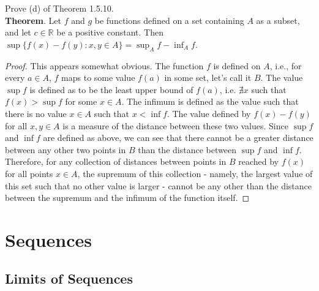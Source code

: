 \documentclass[12pt]{book}
\newenvironment{exercise}[2][Exercise]{\begin{trivlist}
\item[\hskip \labelsep {\bfseries #1}\hskip \labelsep {\bfseries #2.}]}{\end{trivlist}}
\begin{document}
\begin{exercise}{1.5.13}
Prove (d) of Theorem 1.5.10. \\

\textbf{Theorem}. Let $f$ and $g$ be functions defined on a set containing $A$ as a subset, and let $c \in \mathbb{R}$ be a positive constant. Then $\sup \{ f(x) - f(y): x, y \in A \} = \sup_A f - \inf_A f$.
	\begin{proof}
	This appears somewhat obvious. The function $f$ is defined on $A$, i.e., for every $a \in A$, $f$ maps to some value $f(a)$ in some set, let's call it $B$. The value $\sup f$ is defined as to be the least upper bound of $f(a)$, i.e. $\nexists x$ such that $f(x) > \sup f$ for some $x \in A$. The infimum is defined as the value such that there is no value $x \in A$ such that $x < \inf f$. The value defined by $f(x) - f(y)$ for all $x,y \in A$ is a measure of the distance between these two values. Since $\sup f$ and $\inf f$ are defined as above, we can see that there cannot be a greater distance between any other two points in $B$ than the distance between $\sup f$ and $\inf f$. Therefore, for any collection of distances between points in $B$ reached by $f(x)$ for all points $x \in A$, the supremum of this collection - namely, the largest value of this set such that no other value is larger - cannot be any other than the distance between the supremum and the infimum of the function itself.
	\end{proof}
\end{exercise}



\chapter{Sequences}
\section{Limits of Sequences}
\end{document}

